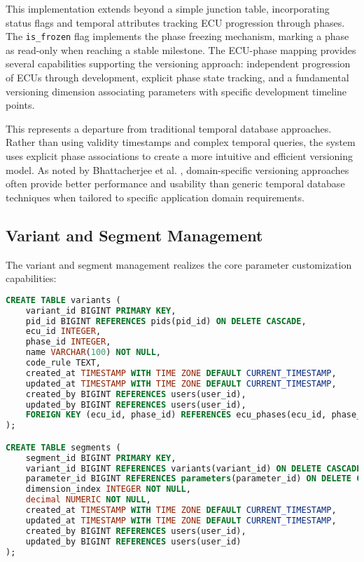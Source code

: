This implementation extends beyond a simple junction table, incorporating status flags and temporal attributes tracking ECU progression through phases. The \texttt{is\_frozen} flag implements the phase freezing mechanism, marking a phase as read-only when reaching a stable milestone. The ECU-phase mapping provides several capabilities supporting the versioning approach: independent progression of ECUs through development, explicit phase state tracking, and a fundamental versioning dimension associating parameters with specific development timeline points.

This represents a departure from traditional temporal database approaches. Rather than using validity timestamps and complex temporal queries, the system uses explicit phase associations to create a more intuitive and efficient versioning model. As noted by Bhattacherjee et al. \cite{bhattacherjee2015principles}, domain-specific versioning approaches often provide better performance and usability than generic temporal database techniques when tailored to specific application domain requirements.

\subsection{Variant and Segment Management}
\label{subsec:variant-segment-management}

The variant and segment management realizes the core parameter customization capabilities:

\begin{lstlisting}[language=SQL, caption={Variant and Segment Implementation}, label={lst:variant-segment-tables}]
CREATE TABLE variants (
    variant_id BIGINT PRIMARY KEY,
    pid_id BIGINT REFERENCES pids(pid_id) ON DELETE CASCADE,
    ecu_id INTEGER,
    phase_id INTEGER,
    name VARCHAR(100) NOT NULL,
    code_rule TEXT,
    created_at TIMESTAMP WITH TIME ZONE DEFAULT CURRENT_TIMESTAMP,
    updated_at TIMESTAMP WITH TIME ZONE DEFAULT CURRENT_TIMESTAMP,
    created_by BIGINT REFERENCES users(user_id),
    updated_by BIGINT REFERENCES users(user_id),
    FOREIGN KEY (ecu_id, phase_id) REFERENCES ecu_phases(ecu_id, phase_id)
);

CREATE TABLE segments (
    segment_id BIGINT PRIMARY KEY,
    variant_id BIGINT REFERENCES variants(variant_id) ON DELETE CASCADE,
    parameter_id BIGINT REFERENCES parameters(parameter_id) ON DELETE CASCADE,
    dimension_index INTEGER NOT NULL,
    decimal NUMERIC NOT NULL,
    created_at TIMESTAMP WITH TIME ZONE DEFAULT CURRENT_TIMESTAMP,
    updated_at TIMESTAMP WITH TIME ZONE DEFAULT CURRENT_TIMESTAMP,
    created_by BIGINT REFERENCES users(user_id),
    updated_by BIGINT REFERENCES users(user_id)
);
\end{lstlisting}

